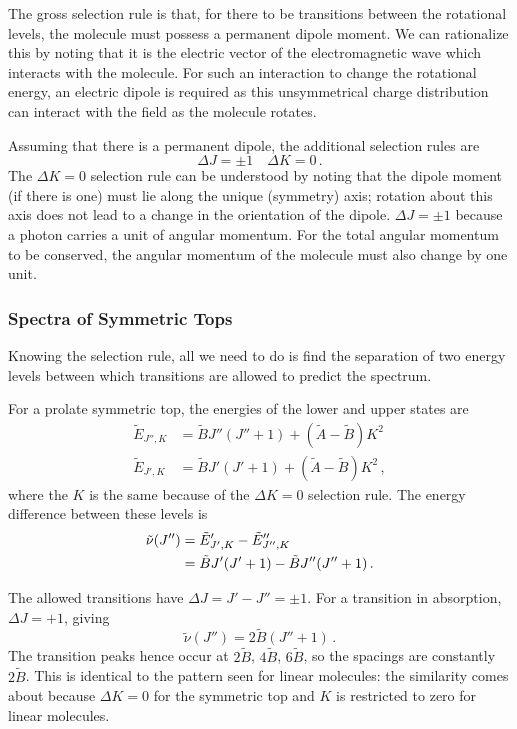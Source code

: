 \documentclass{article}
\theoremstyle{plain}\theoremheaderfont{\normalfont\itshape}\theorembodyfont{\rmfamily}\theoremseparator{.}\newtheorem*{rem}{Remark}\newtheorem*{ex}{Example}\newtheorem*{proof}{Proof}\newtheorem*{altp}{Alternative proof}
\theoremstyle{plain}\theoremheaderfont{\normalfont\bfseries}\theorembodyfont{\rmfamily}\theoremseparator{.}\newtheorem{thm}{Theorem}[section]\newtheorem{lem}[thm]{Lemma}\newtheorem{prop}[thm]{Proposition}\newtheorem*{cor}{Corollary}\newtheorem{defn}[thm]{Definition}\newtheorem{clm}[thm]{Claim}\newtheorem{clminproof}{Claim}\newtheorem{pos}{Postulate}[section]
\theoremstyle{break}\theoremheaderfont{\normalfont\itshape}\theorembodyfont{\rmfamily}\theoremseparator{.\medskip}\newtheorem*{proofskip}{Proof}\newtheorem*{exs}{Examples}\newtheorem*{rems}{Remarks}
\theoremstyle{break}\theoremheaderfont{\normalfont\bfseries}\theorembodyfont{\rmfamily}\theoremseparator{.\medskip}\newtheorem{lemskip}[thm]{Lemma}\newtheorem{defnskip}[thm]{Definition}\newtheorem{propskip}[thm]{Proposition}\newtheorem{thmskip}[thm]{Theorem}
\numberwithin{equation}{section}
\begin{document}
    The gross selection rule is that, for there to be transitions between the rotational levels, the molecule must possess a permanent dipole moment. We can rationalize this by noting that it is the electric vector of the electromagnetic wave which interacts with the molecule. For such an interaction to change the rotational energy, an electric dipole is required as this unsymmetrical charge distribution can interact with the field as the molecule rotates.

    Assuming that there is a permanent dipole, the additional selection rules are
    \begin{equation}
        \Delta J=\pm 1\quad\Delta K=0\,.
    \end{equation}
    The \(\Delta K=0\) selection rule can be understood by noting that the dipole moment (if there is one) must lie along the unique (symmetry) axis; rotation about this axis does not lead to a change in the orientation of the dipole. \(\Delta J=\pm 1\) because a photon carries a unit of angular momentum. For the total angular momentum to be conserved, the angular momentum of the molecule must also change by one unit.

    \subsubsection{Spectra of Symmetric Tops}
    Knowing the selection rule, all we need to do is find the separation of two energy levels between which transitions are allowed to predict the spectrum.

    For a prolate symmetric top, the energies of the lower and upper states are
    \begin{align}
        \tilde{E}_{J'',K}&=\tilde{B}J''(J''+1)+(\tilde{A}-\tilde{B})K^2\\
        \tilde{E}_{J',K}&=\tilde{B}J'(J'+1)+(\tilde{A}-\tilde{B})K^2\,,
    \end{align}
    where the \(K\) is the same because of the \(\Delta K=0\) selection rule. The energy difference between these levels is
    \begin{align}
        \tilde{\nu}(J'')&=\tilde{E}'_{J',K}-\tilde{E}''_{J'',K}\notag\\
        &=\tilde{B}J'(J'+1)-\tilde{B}J''(J''+1)\,.
    \end{align}

    The allowed transitions have \(\Delta J=J'-J''=\pm 1\). For a transition in absorption, \(\Delta J=+1\), giving
    \begin{equation}
        \tilde{\nu}(J'')=2\tilde{B}(J''+1)\,.
    \end{equation}
    The transition peaks hence occur at \(2\tilde{B}\), \(4\tilde{B}\), \(6\tilde{B}\), so the spacings are constantly \(2\tilde{B}\). This is identical to the pattern seen for linear molecules: the similarity comes about because \(\Delta K=0\) for the symmetric top and \(K\) is restricted to zero for linear molecules.
\end{document}
